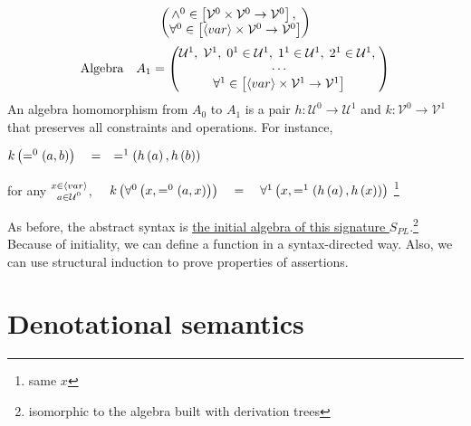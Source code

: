 \begin{enumcirc}
\[\begin{pmatrix}
			\wedge^0 \in \left[ \mathcal{V}^0 \times \mathcal{V}^0 \rightarrow \mathcal{V}^0 \right],\;                              \\
			\forall^0 \in \left[ \left\langle var \right\rangle \times \mathcal{V}^0 \rightarrow \mathcal{V}^0 \right]
		\end{pmatrix}
	\]
	\[
		\textrm{Algebra} \quad A_1 =
		\begin{pmatrix}
			\mathcal{U}^1,\; \mathcal{V}^1,\; 0^1 \in \mathcal{U}^1,\; 1^1 \in \mathcal{U}^1,\; 2^1 \in \mathcal{U}^1,\; \\
			\cdots                                                                                                       \\
			\forall^1 \in \left[ \left\langle var \right\rangle \times \mathcal{V}^1 \rightarrow \mathcal{V}^1 \right]
		\end{pmatrix}
	\]
	An algebra homomorphism from $A_0$ to $A_1$ is a pair
	$h: \mathcal{U}^0 \rightarrow \mathcal{U}^1$ and
	$k: \mathcal{V}^0 \rightarrow \mathcal{V}^1$
	that preserves all constraints and operations.
	For instance,
	\begin{enumrm}
		\item
		$k \left( =^0 \left( a, b \right) \right) \quad = \quad =^1 \left( h\left( a \right), h\left( b \right) \right)$
		\item
		for any
		$\substack{
				x \in \left\langle var \right\rangle\\
				a \in \mathcal{U}^0
			}$,\ \
		$k \left(  \forall^0 \left( x, =^0 \left( a, x \right) \right)  \right) \quad = \quad
			\forall^1 \left( x, =^1 \left( h\left( a \right), h\left( x \right) \right)  \right)$
		\leavevmode
		\footnote{same $x$}
	\end{enumrm}
	As before, the abstract syntax is
	\underline{ the initial algebra of this signature $S_{PL}$}.\footnote{
		isomorphic to the algebra built with derivation trees
	}
	Because of initiality, we can define a function in a syntax-directed way.
	Also, we can use structural induction to prove properties of assertions.
\end{enumcirc}

\section{Denotational semantics}

